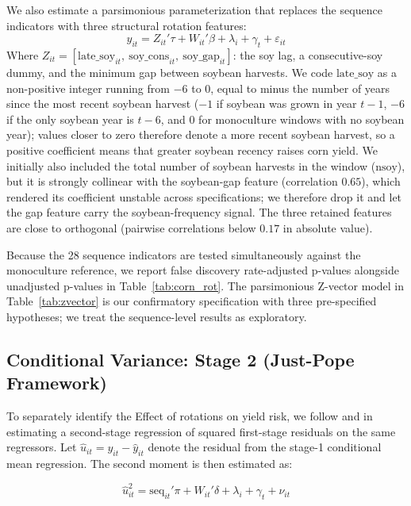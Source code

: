 \documentclass[12pt,letterpaper]{article}
\theoremstyle{remark}
\theoremstyle{remark}
\theoremstyle{plain}
\theoremstyle{definition}
\begin{document}
We also estimate a parsimonious parameterization that replaces the sequence indicators with three structural rotation features:
%
\begin{equation}
  y_{it} = Z_{it}'\tau + W_{it}'\beta + \lambda_i + \gamma_t + \varepsilon_{it}
  \label{eq:zvector}
\end{equation}
%
 Where $Z_{it} = [\text{late\_soy}_{it},\ \text{soy\_cons}_{it},\ \text{soy\_gap}_{it}]$: the soy lag, a consecutive-soy dummy, and the minimum gap between soybean harvests. We code $\text{late\_soy}$ as a non-positive integer running from $-6$ to $0$, equal to minus the number of years since the most recent soybean harvest ($-1$ if soybean was grown in year $t-1$, $-6$ if the only soybean year is $t-6$, and $0$ for monoculture windows with no soybean year); values closer to zero therefore denote a more recent soybean harvest, so a positive coefficient means that greater soybean recency raises corn yield. We initially also included the total number of soybean harvests in the window ($\text{nsoy}$), but it is strongly collinear with the soybean-gap feature (correlation $0.65$), which rendered its coefficient unstable across specifications; we therefore drop it and let the gap feature carry the soybean-frequency signal. The three retained features are close to orthogonal (pairwise correlations below $0.17$ in absolute value).
 
Because the 28 sequence indicators are tested simultaneously against the monoculture reference, we report \cite{Benjamini1995} false discovery rate-adjusted p-values alongside unadjusted p-values in Table~\ref{tab:corn_rot}. The parsimonious Z-vector model in Table~\ref{tab:zvector} is our confirmatory specification with three pre-specified hypotheses; we treat the sequence-level results as exploratory.

\subsection{\label{subsec:stage_2}Conditional Variance: Stage 2 (Just-Pope Framework)}

To separately identify the Effect of rotations on yield risk, we follow \cite{Just1979} and \cite{antle1983} in estimating a second-stage regression of squared first-stage residuals on the same regressors. Let $\hat{u}_{it} = y_{it}-\hat{y}_{it}$ denote
the residual from the stage-1 conditional mean regression. The second moment is then estimated as:

\begin{equation}
    \hat{u}_{it}^2 = \text{seq}_{it}'\pi + W_{it}'\delta + \lambda_i + \gamma_t + \nu_{it}\label{eq:stage2}
\end{equation}
\end{document}
